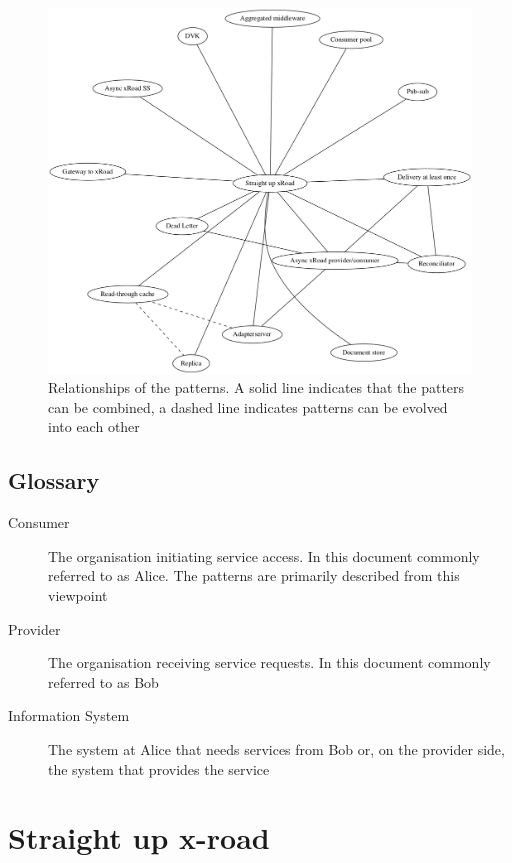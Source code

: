 \documentclass[10pt,a4paper]{article}
\begin{document}
\begin{figure}[htp]
	\begin{center}
		\includegraphics[width=1\textwidth]{gfx/patterns.png}
		\caption{Relationships of the patterns. A solid line indicates that the patters can be combined, a dashed line indicates patterns can be evolved into each other}
		\label{fig:patterns}
	\end{center}
\end{figure}

\subsection{Glossary}
\begin{description}
	\item[Consumer] The organisation initiating service access. In this document commonly referred to as Alice. The patterns are primarily described from this viewpoint
	\item[Provider] The organisation receiving service requests. In this document commonly referred to as Bob 
	\item[Information System] The system at Alice that needs services from Bob or, on the provider side, the system that provides the service
\end{description}

\section{Straight up x-road}
\label{sec:p:1}
\end{document}
